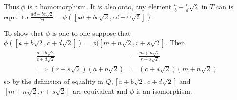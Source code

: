\documentclass[paper=a4, fontsize=11pt]{jhwhw} %
\begin{document}
Thus $\phi$ is a homomorphism. It is also onto, any element $\frac{a}{b} + \frac{c}{d}\sqrt{2}$ in $T$ can is equal to $\frac{ad + bc\sqrt{2}}{bd} = \phi([ad + bc\sqrt{2}, cd + 0\sqrt{2}])$.

To show that $\phi$ is one to one suppose that $\phi([a + b\sqrt{2}, c + d\sqrt{2}]) = \phi([m + n\sqrt{2}, r + s\sqrt{2}]$. Then 
\begin{align}
    \begin{split}
        \frac{a + b\sqrt{2}}{c + d\sqrt{2}} &= \frac{m + n\sqrt{2}}{r + s\sqrt{2}}\\
        \implies (r + s\sqrt{2})(a + b\sqrt{2}) &= (c + d\sqrt{2})(m + n\sqrt{2})
    \end{split}
\end{align}
so by the definition of equality in $Q, [a+b\sqrt{2}, c + d\sqrt{2}]$ and $[m + n\sqrt{2}, r + s\sqrt{2}]$ are equivalent and $\phi$ is an isomorphism. 
\end{document}
